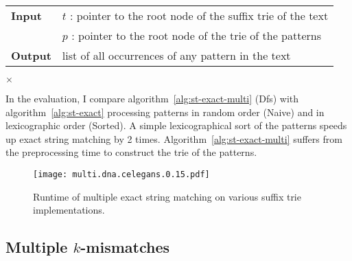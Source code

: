 \begin{center}
\begin{minipage}[t]{.8\textwidth}
\begin{algorithm}[H]
\begin{tabular}{ll}
\textbf{Input}  & $t$ : pointer to the root node of the suffix trie of the text\\
 			    & $p$ : pointer to the root node of the trie of the patterns\\
\textbf{Output} & list of all occurrences of any pattern in the text\\
\end{tabular}
\begin{algorithmic}[1]
	\State \Report {} $\times$ 
\Else
	\State {}
	\Repeat
			\State {}
			\State {}
		\EndIf
\EndIf
\end{algorithmic}
\label{alg:st-exact-multi}
\end{algorithm}
\end{minipage}
\end{center}

In the evaluation, I compare algorithm~\ref{alg:st-exact-multi} (Dfs) with algorithm~\ref{alg:st-exact} processing patterns in random order (Naive) and in lexicographic order (Sorted).
A simple lexicographical sort of the patterns speeds up exact string matching by 2 times.
Algorithm~\ref{alg:st-exact-multi} suffers from the preprocessing time to construct the trie of the patterns.


\begin{figure}[h]
\begin{center}
\caption[Multiple exact string matching runtime]{Runtime of multiple exact string matching on various suffix trie implementations.}
\label{fig:query-dna-exact-multi}
\texttt{[image: multi.dna.celegans.0.15.pdf]}
\end{center}
\end{figure}

\subsection{Multiple $k$-mismatches}
\label{sec:index:algo:multimismatch}

